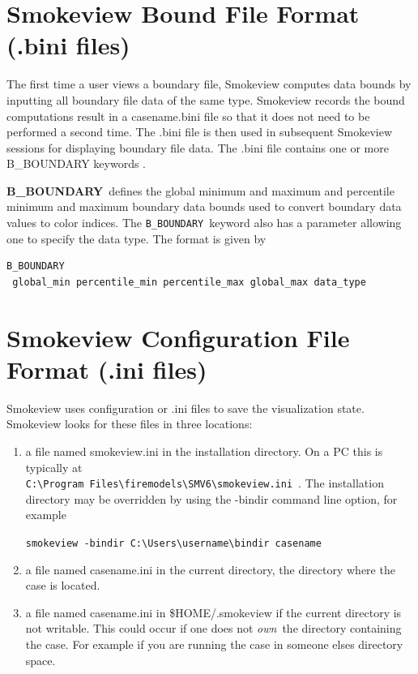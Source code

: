 \documentclass[11pt,twoside]{book}
\begin{document}
\section{Smokeview Bound File Format (.bini files)}
The first time a user views a boundary file, Smokeview computes data bounds by inputting
all boundary file data of the same type.
Smokeview records the bound computations result in a casename.bini file
so that it does not need to be performed a second time.  The .bini file is
then used in subsequent Smokeview sessions for displaying boundary file data.
The .bini file contains one or more B\_BOUNDARY keywords .

{\bf B\_BOUNDARY}\ defines the global minimum and maximum and percentile minimum and
maximum boundary
data bounds used to convert boundary data values to color indices.
The {\tt B\_BOUNDARY}\ keyword also has a parameter allowing
one to specify the data type.  The format is given by
\begin{lstlisting}
B_BOUNDARY
 global_min percentile_min percentile_max global_max data_type
\end{lstlisting}

\section{Smokeview Configuration File Format (.ini files)}
\label{sectionconfig}
\label{appendixini}

Smokeview uses configuration or .ini files to save the visualization state.
Smokeview looks for these files in three locations:
\begin{enumerate}
\item a file named smokeview.ini in the installation directory.  On a PC this is typically at\\
{\tt C:\textbackslash Program~Files\textbackslash firemodels\textbackslash SMV6\textbackslash smokeview.ini}~.
The installation directory may be
overridden by using the -bindir command line option, for example

{\tt smokeview -bindir C:\textbackslash Users\textbackslash username\textbackslash bindir casename}

\item a file named casename.ini in the current directory, the directory where the case is located.
\item a file named casename.ini in \$HOME/.smokeview if the current directory is not writable.
This could occur if one does not {\em own}\ the directory containing the case.
For example if you are running the case in someone elses directory space.
\end{enumerate}
\end{document}
